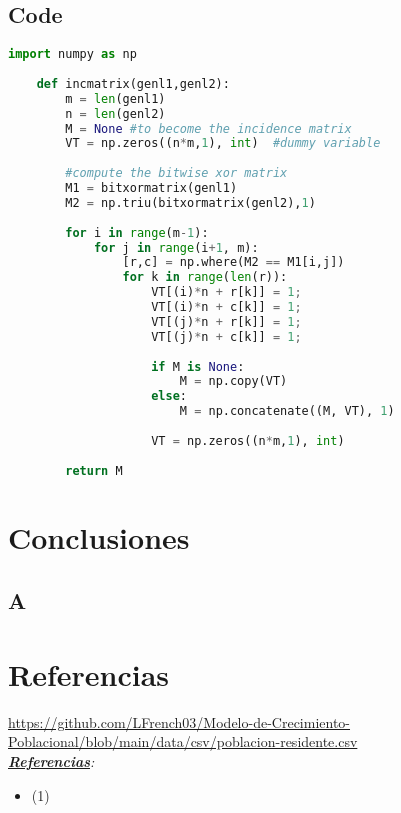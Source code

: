 \documentclass{article}
\begin{document}
\subsection{Code}
\begin{lstlisting}[language=Python, caption=Python example]	%Codigo
    import numpy as np
        
    def incmatrix(genl1,genl2):
        m = len(genl1)
        n = len(genl2)
        M = None #to become the incidence matrix
        VT = np.zeros((n*m,1), int)  #dummy variable
        
        #compute the bitwise xor matrix
        M1 = bitxormatrix(genl1)
        M2 = np.triu(bitxormatrix(genl2),1) 
    
        for i in range(m-1):
            for j in range(i+1, m):
                [r,c] = np.where(M2 == M1[i,j])
                for k in range(len(r)):
                    VT[(i)*n + r[k]] = 1;
                    VT[(i)*n + c[k]] = 1;
                    VT[(j)*n + r[k]] = 1;
                    VT[(j)*n + c[k]] = 1;
                    
                    if M is None:
                        M = np.copy(VT)
                    else:
                        M = np.concatenate((M, VT), 1)
                    
                    VT = np.zeros((n*m,1), int)
        
        return M
    \end{lstlisting}
\clearpage	%

\section{Conclusiones}
\subsection{A}	%

\cleardoublepage	%

\section{Referencias}	%
\url{https://github.com/LFrench03/Modelo-de-Crecimiento-Poblacional/blob/main/data/csv/poblacion-residente.csv}	%
\\\textit{\textbf{\underline{Referencias}}:}

\begin{itemize}	%
    \item (1)
\end{itemize}
\end{document}
